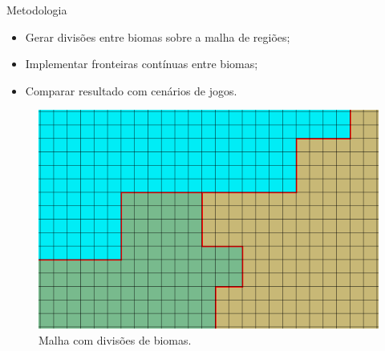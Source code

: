 \begin{frame}{Metodologia}
    \begin{itemize}
        \item Gerar divisões entre biomas sobre a malha de regiões;
        \item Implementar fronteiras contínuas entre biomas;
        \item Comparar resultado com cenários de jogos.
    \end{itemize}
    
    \begin{figure}[H]
        \centering
        \includegraphics[width=.6\textwidth, height=.5\textheight]{img/squadStripBiomes}
        \caption{Malha com divisões de biomas.}
        \label{fig:squadStrip2}
    \end{figure}
    
\end{frame}